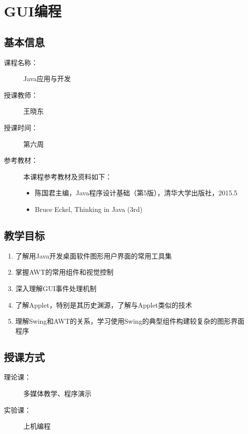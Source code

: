 \chapter{GUI编程}
\label{chp:Java-GUI-programming}

\section*{基本信息}
\sline
\begin{description}
\item[课程名称：] Java应用与开发
\item[授课教师：] 王晓东
\item[授课时间：] 第六周
\item[参考教材：] 本课程参考教材及资料如下：
  \begin{itemize}
  \item 陈国君主编，Java程序设计基础（第5版），清华大学出版社，2015.5
  \item Bruce Eckel, Thinking in Java (3rd)
  \end{itemize}
\end{description}

\section*{教学目标}

\sline

\begin{enumerate}
\item 了解用Java开发桌面软件图形用户界面的常用工具集
\item 掌握AWT的常用组件和视觉控制
\item 深入理解GUI事件处理机制
\item 了解Applet，特别是其历史渊源，了解与Applet类似的技术
\item 理解Swing和AWT的关系，学习使用Swing的典型组件构建较复杂的图形界面程序
\end{enumerate}  

\section*{授课方式}

\sline
\begin{description}
\item[理论课：] 多媒体教学、程序演示
\item[实验课：] 上机编程
\end{description}


